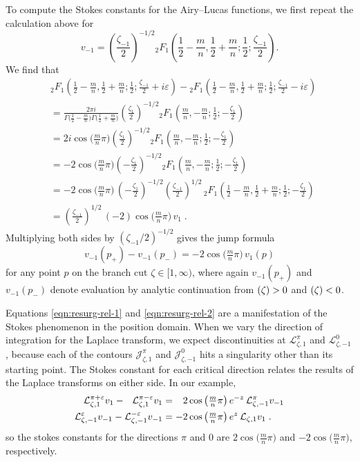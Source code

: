 \documentclass{article}
\let\Im\relax
\DeclareMathOperator{\Im}{Im}
\newcommand{\laplace}{\mathcal{L}}
\theoremstyle{definition}
\theoremstyle{plain}
\begin{document}
To compute the Stokes constants for the Airy--Lucas functions, we first repeat the calculation above for
\[ v_{-1} = \left(\frac{\zeta_{-1}}{2}\right)^{-1/2} {}_2F_1\left(\frac{1}{2}-\frac{m}{n},\frac{1}{2}+\frac{m}{n};\frac{1}{2};\frac{\zeta_{-1}}{2}\right). \]
We find that
\begin{align*}
&{}_2F_1\left(\frac{1}{2}-\frac{m}{n},\frac{1}{2}+\frac{m}{n};\frac{1}{2};\frac{\zeta_{-1}}{2}+i\varepsilon\right)-{}_2F_1\left(\frac{1}{2}-\frac{m}{n},\frac{1}{2}+\frac{m}{n};\frac{1}{2};\frac{\zeta_{-1}}{2}-i\varepsilon\right) \\
&=\frac{2\pi i}{\Gamma\big(\tfrac{1}{2}-\tfrac{m}{n}\big)\Gamma\big(\tfrac{1}{2}+\tfrac{m}{n}\big)} \left(\frac{\zeta_1}{2}\right)^{-1/2} {}_2F_1\left(\frac{m}{n},-\frac{m}{n};\frac{1}{2};-\frac{\zeta_1}{2}\right) \\
&=2i\cos\big(\tfrac{m}{n}\pi\big) \left(\frac{\zeta_1}{2}\right)^{-1/2} {}_2F_1\left(\frac{m}{n},-\frac{m}{n};\frac{1}{2};-\frac{\zeta_1}{2}\right) \\
&=-2\cos\big(\tfrac{m}{n}\pi\big) \left(-\frac{\zeta_1}{2}\right)^{-1/2} {}_2F_1\left(\frac{m}{n},-\frac{m}{n};\frac{1}{2};-\frac{\zeta_1}{2}\right) \\
&=-2\cos\big(\tfrac{m}{n}\pi\big)\,\left(-\frac{\zeta_{1}}{2}\right)^{-1/2} \left(\frac{\zeta_{-1}}{2}\right)^{1/2}\, {}_2F_1\left(\frac{1}{2}-\frac{m}{n},\frac{1}{2}+\frac{m}{n};\frac{1}{2};-\frac{\zeta_1}{2}\right) \\
&=\left(\frac{\zeta_{-1}}{2}\right)^{1/2}\,(-2)\cos\big(\tfrac{m}{n}\pi\big)\,v_1\;.
\end{align*}
Multiplying both sides by $(\zeta_{-1}/2)^{-1/2}$ gives the jump formula
\begin{equation}\label{eqn:resurg-rel-2}
v_{-1}(p_+) - v_{-1}(p_-) = -2\cos\big(\tfrac{m}{n}\pi\big)\,v_1(p)
\end{equation}
for any point $p$ on the branch cut $\zeta \in [1, \infty)$, where again $v_{-1}(p_+)$ and $v_{-1}(p_-)$ denote evaluation by analytic continuation from $\Im(\zeta) > 0$ and $\Im(\zeta) < 0$.

Equations \eqref{eqn:resurg-rel-1} and \eqref{eqn:resurg-rel-2} are a manifestation of the Stokes phenomenon in the position domain. When we vary the direction of integration for the Laplace transform, we expect discontinuities at $\laplace^\pi_{\zeta,1}$ and $\laplace^0_{\zeta,-1}$, because each of the contours $\mathcal{J}^\pi_{\zeta,1}$ and $\mathcal{J}^0_{\zeta,-1}$ hits a singularity other than its starting point. The Stokes constant for each critical direction relates the results of the Laplace transforms on either side. In our example,
\begin{align*}
\laplace_{\zeta,1}^{\pi+\varepsilon} v_1 - \hphantom{{}_{-}}\laplace_{\zeta,1}^{\pi-\varepsilon} v_1 & = \hphantom{-}2\cos\big(\tfrac{m}{n}\pi\big) \, e^{-z}\, \laplace_{\zeta,-1}^{\pi} v_{-1} \\
\laplace_{\zeta,-1}^{\varepsilon} v_{-1} - \laplace_{\zeta,-1}^{-\varepsilon} v_{-1} & = -2\cos\big(\tfrac{m}{n}\pi\big) \, e^z \, \laplace_{\zeta,1} v_{1}\;.
\end{align*}
so the stokes constants for the directions $\pi$ and $0$ are $2\cos\big(\tfrac{m}{n}\pi\big)$ and $-2\cos\big(\tfrac{m}{n}\pi\big)$, respectively.
\end{document}
